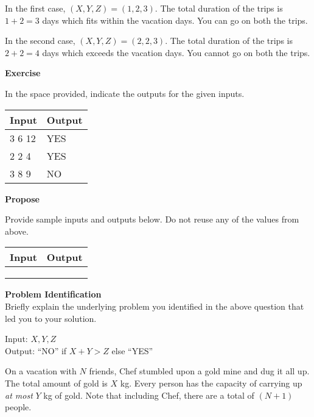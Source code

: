 \documentclass[a4paper]{exam}
\newcommand\heading[1]{\textbf{#1}}
\begin{document}
\begin{questions}
    In the first case, $(X,Y,Z) = (1,2,3)$. The total duration of the trips is $1+2=3$ days which fits within the vacation days. You can go on both the trips.

    In the second case, $(X,Y,Z) = (2,2,3)$. The total duration of the trips is $2+2=4$ days which exceeds the vacation days. You cannot go on both the trips.

    \heading{Exercise}

    In the space provided, indicate the outputs for the given inputs.

    \begin{tabularx}{\textwidth}{|X|X|}
        \rowcolor{gray!50}
        \hline
        Input  & Output \\ \hline\hline
        3 6 12 & YES    \\\hline
        2 2 4  & YES    \\\hline
        3 8 9  & NO     \\\hline
    \end{tabularx}

    \heading{Propose}

    Provide sample inputs and outputs below. Do not reuse any of the values from above.

    \begin{tabularx}{\textwidth}{|X|X|}
        \rowcolor{gray!50}
        \hline
        Input & Output \\ \hline\hline
              &        \\\hline
              &        \\\hline
              &        \\\hline
    \end{tabularx}
    \heading{Problem Identification}\\
    Briefly explain the underlying problem you identified in the above question that led you to your solution.


  \begin{mdframed}
    Input: $X,Y,Z$\\
    Output: ``NO'' if $X+Y>Z$ else ``YES''
  \end{mdframed}


    On a vacation with $N$ friends, Chef stumbled upon a gold mine and dug it all up. The total amount of gold is $X$ kg. Every person has the capacity of carrying up \textit{at most} $Y$ kg of gold. Note that including Chef, there are a total of $(N+1)$ people.


\end{questions}
\end{document}
